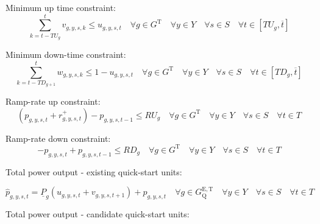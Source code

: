 \documentclass{article}
\newcommand{\sGeneratorsThermal}{G^{\mathrm{T}}}
\newcommand{\sYears}{Y}
\newcommand{\sScenarios}{S}
\newcommand{\sIntervals}{T}
\newcommand{\sGeneratorsExistingThermalQuickStart}{G^{\mathrm{E,T}}_\mathrm{Q}}
\newcommand{\iGenerator}{g}
\newcommand{\iYear}{y}
\newcommand{\iScenario}{s}
\newcommand{\iInterval}{t}
\newcommand{\iIntervalAlias}{k}
\newcommand{\iIntervalTerminal}{\overline{\iInterval}}
\newcommand{\cUpTimeMin}[1][\iGenerator]{TU_{#1}}
\newcommand{\cDownTimeMin}[1][\iGenerator]{TD_{#1}}
\newcommand{\cRampRateUp}[1][\iGenerator]{RU_{#1}}
\newcommand{\cRampRateDown}[1][\iGenerator]{RD_{#1}}
\newcommand{\cPowerOutputMin}[1][\iGenerator]{\underline{P}_{#1}}
\newcommand{\vStartupIndicator}[1][\iGenerator,\iYear,\iScenario,\iInterval]{v_{#1}}
\newcommand{\vShutdownIndicator}[1][\iGenerator,\iYear,\iScenario,\iInterval]{w_{#1}}
\newcommand{\vReserveUp}[1][\iGenerator,\iYear,\iScenario,\iInterval]{r^{+}_{#1}}
\newcommand{\vOnIndicator}[1][\iGenerator,\iYear,\iScenario,\iInterval]{u_{#1}}
\newcommand{\vPower}[1][\iGenerator,\iYear,\iScenario,\iInterval]{p_{#1}}
\newcommand{\vPowerTotal}[1][\iGenerator,\iYear,\iScenario,\iInterval]{\hat{p}_{#1}}
\begin{document}
Minimum up time constraint:
\begin{equation}
\sum\limits_{\iIntervalAlias=\iInterval-\cUpTimeMin}^{\iInterval} \vStartupIndicator[\iGenerator,\iYear,\iScenario,\iIntervalAlias] \leq \vOnIndicator \quad \forall \iGenerator \in \sGeneratorsThermal \quad \forall \iYear \in \sYears \quad \forall \iScenario \in \sScenarios \quad \forall \iInterval \in \left[\cUpTimeMin, \iIntervalTerminal \right]
\end{equation}

Minimum down-time constraint:
\begin{equation}
\sum\limits_{\iIntervalAlias=\iInterval-\cDownTimeMin[\iGenerator+1]}^{\iInterval}\vShutdownIndicator[\iGenerator,\iYear,\iScenario,\iIntervalAlias] \leq 1 - \vOnIndicator \quad \forall \iGenerator \in \sGeneratorsThermal \quad \forall \iYear \in \sYears \quad \forall \iScenario \in \sScenarios \quad \forall \iInterval \in \left[\cDownTimeMin, \iIntervalTerminal \right]
\end{equation}

Ramp-rate up constraint:
\begin{equation}
\left(\vPower + \vReserveUp\right) - \vPower[\iGenerator,\iYear,\iScenario,\iInterval-1] \leq \cRampRateUp \quad \forall \iGenerator \in \sGeneratorsThermal \quad \forall \iYear \in \sYears \quad \forall \iScenario \in \sScenarios \quad \forall \iInterval \in \sIntervals
\end{equation}

Ramp-rate down constraint:
\begin{equation}
- \vPower + \vPower[\iGenerator,\iYear,\iScenario,\iInterval-1] \leq \cRampRateDown \quad \forall \iGenerator \in \sGeneratorsThermal \quad \forall \iYear \in \sYears \quad \forall \iScenario \in \sScenarios \quad \forall \iInterval \in \sIntervals
\end{equation}

Total power output - existing quick-start units:

\begin{equation}
\vPowerTotal = \cPowerOutputMin \left(\vOnIndicator + \vStartupIndicator[\iGenerator,\iYear,\iScenario,\iInterval+1]\right) + \vPower \quad \forall \iGenerator \in \sGeneratorsExistingThermalQuickStart \quad \forall \iYear \in \sYears \quad \forall \iScenario \in \sScenarios \quad \forall \iInterval \in \sIntervals
\end{equation}

Total power output - candidate quick-start units:
\end{document}
